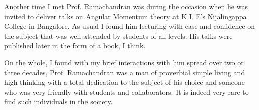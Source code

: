 \medskip

Another time I met Prof. Ramachandran was during the occasion when he was invited to deliver talks on Angular Momentum theory at K L E's Nijalingappa College in Bangalore. As usual I found him lecturing with ease and confidence on the subject that was well attended by students of all levels. His talks were published later in the form of a book, I think.

\medskip

On the whole, I found with my brief interactions with him spread over two or three decades, Prof. Ramachandran was a man of proverbial simple living and high thinking with a total dedication to the subject of his choice and someone who was very friendly with students and collaborators. It is indeed very rare to find such individuals in the society.
